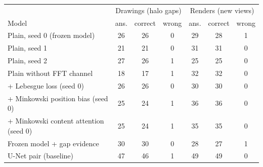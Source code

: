 \begin{tabular}{@{}lcccccc@{}}
\toprule
 & \multicolumn{3}{c}{Drawings (halo gaps)} & \multicolumn{3}{c}{Renders (new views)} \\
Model & ans. & correct & wrong & ans. & correct & wrong \\
\midrule
Plain, seed 0 (frozen model) & 26 & 26 & 0 & 29 & 28 & 1 \\
Plain, seed 1 & 21 & 21 & 0 & 31 & 31 & 0 \\
Plain, seed 2 & 27 & 26 & 1 & 25 & 25 & 0 \\
Plain without FFT channel & 18 & 17 & 1 & 32 & 32 & 0 \\
+ Lebesgue loss (seed 0) & 26 & 26 & 0 & 30 & 30 & 0 \\
+ Minkowski position bias (seed 0) & 25 & 24 & 1 & 36 & 36 & 0 \\
+ Minkowski content attention (seed 0) & 25 & 24 & 1 & 35 & 35 & 0 \\
Frozen model + gap evidence & 30 & 30 & 0 & 28 & 27 & 1 \\
U-Net pair (baseline) & 47 & 46 & 1 & 49 & 49 & 0 \\
\bottomrule
\end{tabular}
